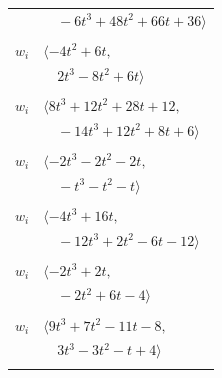 \documentclass[11pt]{article}
\begin{document}
\begin{longtable}{@{}ll@{}}
 & $\quad -6t^{3}+48t^{2}+66t+36\rangle$\\
\addlinespace[2pt]
\multicolumn{2}{@{}p{0.97\textwidth}@{}}{$i=12$, $D_i=1$, $\rho_{ij}$: $3{:}1, \allowbreak 8{:}2, \allowbreak 16{:}1, \allowbreak 17{:}1, \allowbreak 23{:}2, \allowbreak 26{:}2$}\\
$w_i$ & $\langle -4t^{2}+6t,$\\
 & $\quad 2t^{3}-8t^{2}+6t\rangle$\\
\addlinespace[2pt]
\multicolumn{2}{@{}p{0.97\textwidth}@{}}{$i=13$, $D_i=1$, $\rho_{ij}$: $2{:}2, \allowbreak 3{:}2, \allowbreak 5{:}2, \allowbreak 6{:}2, \allowbreak 8{:}1, \allowbreak 15{:}2, \allowbreak 25{:}1, \allowbreak 26{:}2, \allowbreak 28{:}2$}\\
$w_i$ & $\langle 8t^{3}+12t^{2}+28t+12,$\\
 & $\quad -14t^{3}+12t^{2}+8t+6\rangle$\\
\addlinespace[2pt]
\multicolumn{2}{@{}p{0.97\textwidth}@{}}{$i=14$, $D_i=1$, $\rho_{ij}$: $3{:}2, \allowbreak 6{:}1, \allowbreak 10{:}1, \allowbreak 11{:}1, \allowbreak 20{:}2, \allowbreak 29{:}1$}\\
$w_i$ & $\langle -2t^{3}-2t^{2}-2t,$\\
 & $\quad -t^{3}-t^{2}-t\rangle$\\
\addlinespace[2pt]
\multicolumn{2}{@{}p{0.97\textwidth}@{}}{$i=15$, $D_i=1$, $\rho_{ij}$: $3{:}1, \allowbreak 8{:}1, \allowbreak 13{:}1, \allowbreak 18{:}2, \allowbreak 19{:}2, \allowbreak 20{:}1, \allowbreak 26{:}2, \allowbreak 33{:}2$}\\
$w_i$ & $\langle -4t^{3}+16t,$\\
 & $\quad -12t^{3}+2t^{2}-6t-12\rangle$\\
\addlinespace[2pt]
\multicolumn{2}{@{}p{0.97\textwidth}@{}}{$i=16$, $D_i=1$, $\rho_{ij}$: $1{:}1, \allowbreak 7{:}1, \allowbreak 8{:}2, \allowbreak 12{:}2, \allowbreak 23{:}1$}\\
$w_i$ & $\langle -2t^{3}+2t,$\\
 & $\quad -2t^{2}+6t-4\rangle$\\
\addlinespace[2pt]
\multicolumn{2}{@{}p{0.97\textwidth}@{}}{$i=17$, $D_i=1$, $\rho_{ij}$: $4{:}2, \allowbreak 5{:}1, \allowbreak 7{:}2, \allowbreak 12{:}2, \allowbreak 18{:}2, \allowbreak 20{:}1, \allowbreak 22{:}1, \allowbreak 29{:}2$}\\
$w_i$ & $\langle 9t^{3}+7t^{2}-11t-8,$\\
 & $\quad 3t^{3}-3t^{2}-t+4\rangle$\\
\addlinespace[2pt]
\multicolumn{2}{@{}p{0.97\textwidth}@{}}{$i=18$, $D_i=1$, $\rho_{ij}$: $1{:}2, \allowbreak 11{:}2, \allowbreak 15{:}1, \allowbreak 17{:}1, \allowbreak 21{:}2, \allowbreak 22{:}1, \allowbreak 31{:}1, \allowbreak 32{:}1, \allowbreak 33{:}2$}\\

\end{longtable}
\end{document}
